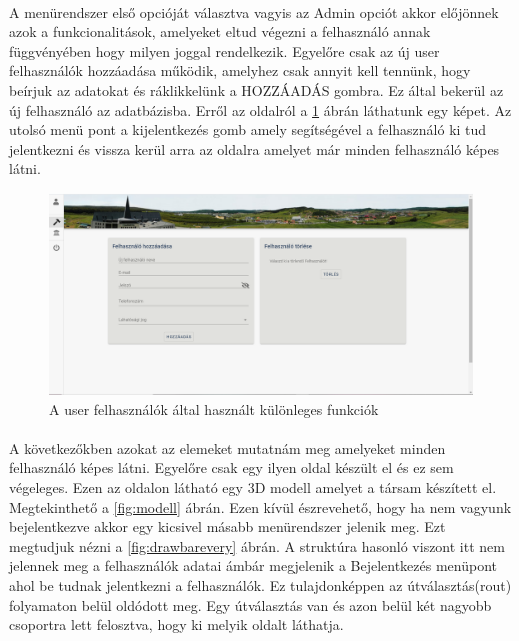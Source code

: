 	\paragraph{}
	A menürendszer első opcióját választva vagyis az Admin opciót akkor előjönnek azok a funkcionalitások, amelyeket eltud végezni a felhasználó annak függvényében hogy milyen joggal rendelkezik. Egyelőre csak az új user felhasználók hozzáadása működik, amelyhez csak annyit kell tennünk, hogy beírjuk az adatokat és ráklikkelünk a HOZZÁADÁS gombra. Ez által bekerül az új felhasználó az adatbázisba. Erről az oldalról a \ref{fig:admin} ábrán láthatunk egy képet. Az utolsó menü pont a kijelentkezés gomb amely segítségével a felhasználó ki  tud jelentkezni és vissza kerül arra az oldalra amelyet már minden felhasználó képes látni.
	\begin{figure}
		\centering
		\includegraphics[scale=0.4]{figures/images/admin.png}
		\caption{A user felhasználók által használt különleges funkciók}
		\label{fig:admin}
	\end{figure}
	
	\paragraph{}
	A következőkben azokat az elemeket mutatnám meg amelyeket minden felhasználó képes látni. Egyelőre csak egy ilyen oldal készült el és ez sem végeleges. Ezen az oldalon látható egy 3D modell amelyet a társam készített el. Megtekinthető a \ref{fig:modell} ábrán. Ezen kívül észrevehető, hogy ha nem vagyunk bejelentkezve akkor egy kicsivel másabb menürendszer jelenik meg. Ezt megtudjuk nézni a \ref{fig:drawbarevery} ábrán. A struktúra hasonló viszont itt nem jelennek meg a felhasználók adatai ámbár megjelenik a Bejelentkezés menüpont ahol be tudnak jelentkezni a felhasználók. Ez tulajdonképpen az útválasztás(rout) folyamaton belül oldódott meg. Egy útválasztás van és azon belül két nagyobb csoportra lett felosztva, hogy ki melyik oldalt láthatja. 
	
